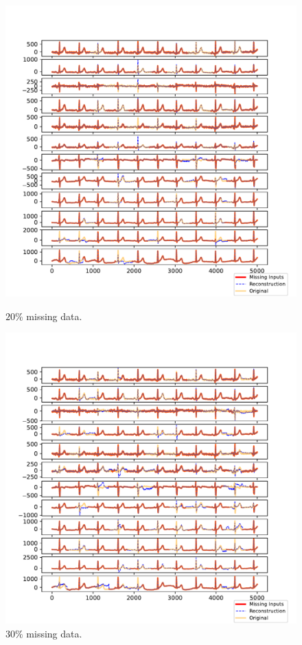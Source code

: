 \documentclass{mldsmsc}
\begin{document}
\begin{figure}[H]
\centering
\begin{minipage}{0.4\linewidth}
    \centering
    \includegraphics[width=\linewidth]{images/missing/psmf_output_20_10.pdf}
    \caption{$20\%$ missing data.}
\end{minipage}%
\hspace{0.05\linewidth}
\begin{minipage}{0.4\linewidth}
    \centering
    \includegraphics[width=\linewidth]{images/missing/psmf_output_30_10.pdf}
    \caption{$30\%$ missing data.}
\end{minipage}


\end{figure}
\end{document}
